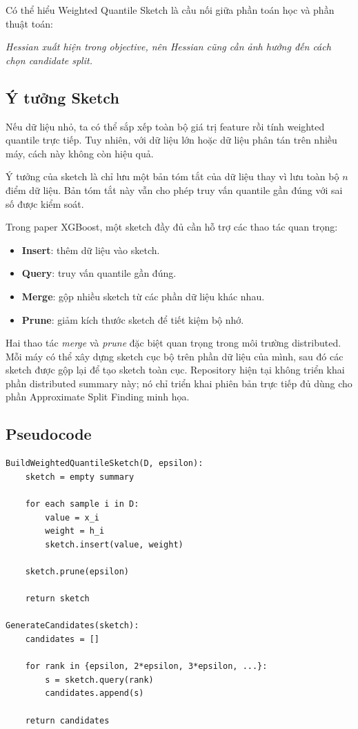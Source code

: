 Có thể hiểu Weighted Quantile Sketch là cầu nối giữa phần toán học và phần thuật toán:

\begin{center}
\textit{Hessian xuất hiện trong objective, nên Hessian cũng cần ảnh hưởng đến cách chọn candidate split.}
\end{center}

\subsection{Ý tưởng Sketch}

Nếu dữ liệu nhỏ, ta có thể sắp xếp toàn bộ giá trị feature rồi tính weighted quantile trực tiếp. Tuy nhiên, với dữ liệu lớn hoặc dữ liệu phân tán trên nhiều máy, cách này không còn hiệu quả.

Ý tưởng của sketch là chỉ lưu một bản tóm tắt của dữ liệu thay vì lưu toàn bộ $n$ điểm dữ liệu. Bản tóm tắt này vẫn cho phép truy vấn quantile gần đúng với sai số được kiểm soát.

Trong paper XGBoost, một sketch đầy đủ cần hỗ trợ các thao tác quan trọng:

\begin{itemize}
    \item \textbf{Insert}: thêm dữ liệu vào sketch.
    \item \textbf{Query}: truy vấn quantile gần đúng.
    \item \textbf{Merge}: gộp nhiều sketch từ các phần dữ liệu khác nhau.
    \item \textbf{Prune}: giảm kích thước sketch để tiết kiệm bộ nhớ.
\end{itemize}

Hai thao tác \textit{merge} và \textit{prune} đặc biệt quan trọng trong môi trường distributed. Mỗi máy có thể xây dựng sketch cục bộ trên phần dữ liệu của mình, sau đó các sketch được gộp lại để tạo sketch toàn cục. Repository hiện tại không triển khai phần distributed summary này; nó chỉ triển khai phiên bản trực tiếp đủ dùng cho phần Approximate Split Finding minh họa.

\subsection{Pseudocode}

\begin{lstlisting}[style=pseudocode, caption={Weighted Quantile Sketch}, label={lst:weighted_quantile_sketch}]
BuildWeightedQuantileSketch(D, epsilon):
    sketch = empty summary

    for each sample i in D:
        value = x_i
        weight = h_i
        sketch.insert(value, weight)

    sketch.prune(epsilon)

    return sketch

GenerateCandidates(sketch):
    candidates = []

    for rank in {epsilon, 2*epsilon, 3*epsilon, ...}:
        s = sketch.query(rank)
        candidates.append(s)

    return candidates
\end{lstlisting}

